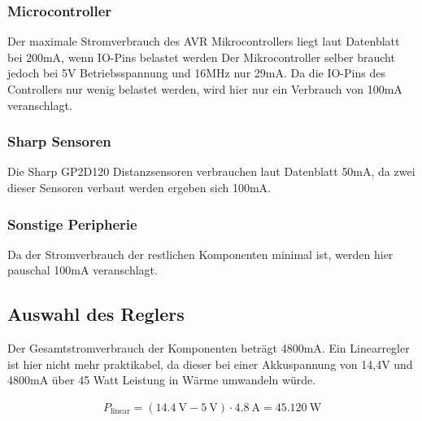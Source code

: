 \subsubsection{Microcontroller}
Der maximale Stromverbrauch des AVR Mikrocontrollers liegt laut Datenblatt\cite{ds-at90can} bei 200mA, wenn IO-Pins belastet werden
Der Mikrocontroller selber braucht jedoch bei 5V Betriebsspannung und 16MHz nur 29mA. Da die IO-Pins des Controllers nur wenig belastet werden,
wird hier nur ein Verbrauch von 100mA veranschlagt.

\subsubsection{Sharp Sensoren}
Die Sharp GP2D120 Distanzsensoren verbrauchen laut Datenblatt \cite{ds-sharp-GP2D120} 50mA, da zwei dieser Sensoren verbaut werden ergeben sich 100mA.

\subsubsection{Sonstige Peripherie}
Da der Stromverbrauch der restlichen Komponenten minimal ist, werden hier pauschal 100mA veranschlagt.

\subsection{Auswahl des Reglers}
Der Gesamtstromverbrauch der Komponenten beträgt 4800mA. Ein Linearregler ist hier nicht mehr praktikabel, da dieser bei einer Akkuspannung von 14,4V und 4800mA über 45 Watt Leistung in Wärme umwandeln würde.

\begin{align*}
P_{\text{linear}}=(\SI{14,4}{\V}-\SI{5}{\V})\cdot \SI{4,8}{\A}=\SI{45,120}{\W}
\end{align*}


